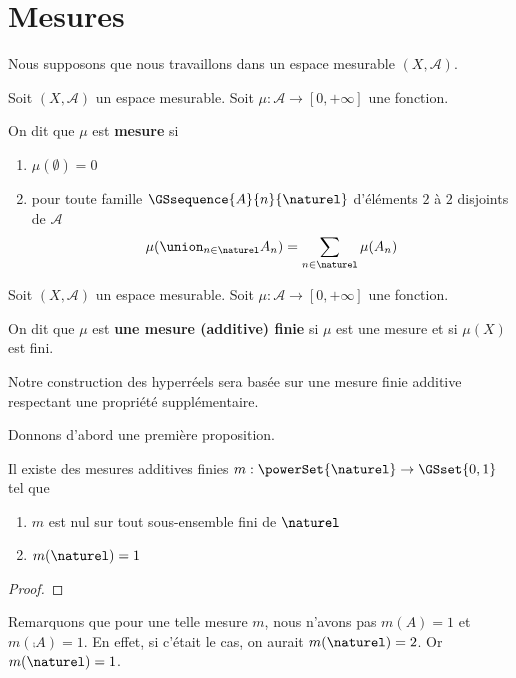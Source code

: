 \chapter{Mesures}

Nous supposons que nous travaillons dans un espace mesurable $(X, \mathcal{A})$.



\begin{definition}
	Soit $(X, \mathcal{A})$ un espace mesurable.
	Soit $\mu : \mathcal{A} \rightarrow [0, + \infty]$ une fonction.

	On dit que $\mu$ est \textbf{mesure} si
	\begin{enumerate}
		\item $\mu(\emptyset) = 0$
		\item pour toute famille $\GSsequence{A}{n}{\naturel}$ d'éléments $2$ à
			$2$ disjoints de $\mathcal{A}$
			\begin{equation}
				\mu(\union_{n \in \naturel} A_{n}) = \sum_{n \in \naturel}
				\mu(A_{n})
			\end{equation}
	\end{enumerate}
\end{definition}

\begin{definition}
	Soit $(X, \mathcal{A})$ un espace mesurable.
	Soit $\mu : \mathcal{A} \rightarrow [0, + \infty]$ une fonction.

	On dit que $\mu$ est \textbf{une mesure (additive) finie} si $\mu$ est une
	mesure et si $\mu(X)$ est fini.
\end{definition}

Notre construction des hyperréels sera basée sur une mesure finie additive
respectant une propriété supplémentaire.

Donnons d'abord une première proposition.

\begin{proposition}
	Il existe des mesures additives finies $m : \powerSet{\naturel} \rightarrow
	\GSset{0, 1}$ tel que
	\begin{enumerate}
		\item $m$ est nul sur tout sous-ensemble fini de $\naturel$
		\item $m(\naturel) = 1$
	\end{enumerate}
\end{proposition}

\ifdefined\outputproof
\begin{proof}

\end{proof}
\fi

Remarquons que pour une telle mesure $m$, nous n'avons pas $m(A) = 1$ et
$m(\comp{A}) = 1$. En effet, si c'était le cas, on aurait $m(\naturel) = 2$. Or
$m(\naturel) = 1$.


